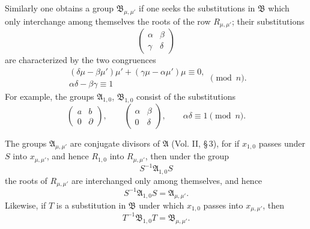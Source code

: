 \documentclass[11pt]{article}
\begin{document}
Similarly one obtains a group $\mathfrak B_{\mu,\mu'}$ if one seeks the substitutions in
$\mathfrak B$ which only interchange among themselves the roots of the row $R_{\mu,\mu'}$;
their substitutions
\[
 \begin{pmatrix}\alpha&\beta\\ \gamma&\delta\end{pmatrix}
\]
are characterized by the two congruences
\begin{equation}
\begin{gathered}
 (\delta\mu-\beta\mu')\mu' + (\gamma\mu-\alpha\mu')\mu\equiv0,\\
 \alpha\delta-\beta\gamma\equiv1
\end{gathered}
\pmod n.
\tag{5}
\end{equation}
For example, the groups $\mathfrak A_{1,0}$, $\mathfrak B_{1,0}$ consist of the substitutions
\[
 \begin{pmatrix}a&b\\0&\partial\end{pmatrix},
 \qquad
 \begin{pmatrix}\alpha&\beta\\0&\delta\end{pmatrix},
 \qquad \alpha\delta\equiv1\pmod n.
\]

The groups $\mathfrak A_{\mu,\mu'}$ are conjugate divisors of $\mathfrak A$ (Vol. II,
\S\,3), for if $x_{1,0}$ passes under $S$ into $x_{\mu,\mu'}$, and hence $R_{1,0}$ into
$R_{\mu,\mu'}$, then under the group
\[
 S^{-1}\mathfrak A_{1,0}S
\]
the roots of $R_{\mu,\mu'}$ are interchanged only among themselves, and hence
\begin{equation}
 S^{-1}\mathfrak A_{1,0}S=\mathfrak A_{\mu,\mu'}.
\tag{6}
\end{equation}
Likewise, if $T$ is a substitution in $\mathfrak B$ under which $x_{1,0}$ passes into
$x_{\mu,\mu'}$, then
\begin{equation}
 T^{-1}\mathfrak B_{1,0}T=\mathfrak B_{\mu,\mu'}.
\tag{7}
\end{equation}
\end{document}
